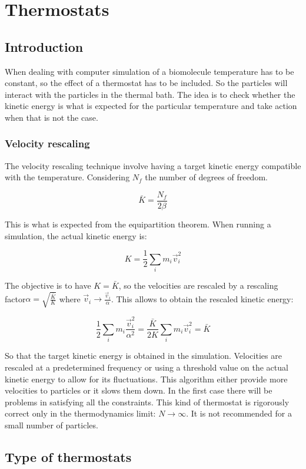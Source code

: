 \chapter{Thermostats}

\section{Introduction}
When dealing with computer simulation of a biomolecule temperature has to be constant, so the effect of a thermostat has to be included.
So the particles will interact with the particles in the thermal bath.
The idea is to check whether the kinetic energy is what is expected for the particular temperature and take action when that is not the case.

	\subsection{Velocity rescaling}
	The velocity rescaling technique involve having a target kinetic energy compatible with the temperature.
	Considering $N_f$ the number of degrees of freedom.

	$$\bar{K} = \frac{N_f}{2\beta}$$

	This is what is expected from the equipartition theorem.
	When running a simulation, the actual kinetic energy is:

	$$K = \frac{1}{2}\sum\limits_i m_i\vec{v}_i^2$$

	The objective is to have $K = \bar{K}$, so the velocities are rescaled by a rescaling factor$\alpha = \sqrt{\frac{\bar{K}}{K}}$ where $\vec{v}_i \rightarrow \frac{\vec{v}_i}{\alpha}$.
	This allows to obtain the rescaled kinetic energy:

	$$\frac{1}{2}\sum\limits_{i}m_i\frac{\vec{v}_i^2}{\alpha^2} = \frac{\bar{K}}{2K}\sum\limits_{i}m_i\vec{v}_i^2 = \bar{K}$$

	So that the target kinetic energy is obtained in the simulation.
	Velocities are rescaled at a predetermined frequency or using a threshold value on the actual kinetic energy to allow for its fluctuations.
	This algorithm either provide more velocities to particles or it slows them down.
	In the first case there will be problems in satisfying all the constraints.
	This kind of thermostat is rigorously correct only in the thermodynamics limit: $N\rightarrow\infty$.
	It is not recommended for a small number of particles.

\section{Type of thermostats}

